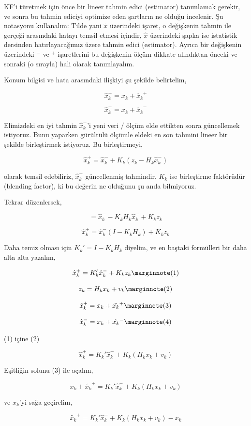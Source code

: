 \documentclass[12pt,fleqn]{article}\usepackage{../../common}
\begin{document}
KF'i türetmek için önce bir lineer tahmin edici (estimator) tanımlamak gerekir,
ve sonra bu tahmin ediciyi optimize eden şartların ne olduğu incelenir. Şu
notasyonu kullanalım: Tilde yani $\tilde{x}$ üzerindeki işaret, o değişkenin
tahmin ile gerçeği arasındaki hatayı temsil etmesi içindir, $\hat{x}$ üzerindeki
şapka ise istatistik dersinden hatırlayacağımız üzere tahmin edici
(estimator). Ayrıca bir değişkenin üzerindeki $^-$ ve $^+$ işaretlerini bu
değişkenin ölçüm dikkate alındıktan önceki ve sonraki (o sırayla) hali olarak
tanımlayalım.

Konum bilgisi ve hata arasındaki ilişkiyi şu şekilde belirtelim,

$$ \hat{x}_k^+ = x_k + \tilde{x_k}^+ $$

$$ \hat{x}_k^- = x_k + \tilde{x_k}^- $$

Elimizdeki en iyi tahmin $\hat{x}_k^-$'i yeni veri / ölçüm elde ettikten sonra
güncellemek istiyoruz. Bunu yaparken gürültülü ölçümle eldeki en son tahmini
lineer bir şekilde birleştirmek istiyoruz. Bu birleştirmeyi,

$$ \hat{x}_k^+ = \hat{x}_k^- + K_k (z_k - H_k \hat{x}_k^-)   $$

olarak temsil edebiliriz, $\hat{x}_k^+$ güncellenmiş tahmindir, $K_k$ ise
birleştirme faktörüdür (blending factor), ki bu değerin ne olduğunu şu anda
bilmiyoruz.

Tekrar düzenlersek, 

$$= \hat{x}_k^- - K_kH_k\hat{x}_k^- + K_kz_k    $$

$$ \hat{x}_k^+ = \hat{x}_k^- (I - K_kH_k) + K_kz_k $$

Daha temiz olması için $K_k' = I - K_kH_k$ diyelim, ve en baştaki
formülleri bir daha alta alta yazalım,

$$ 
\hat{x}_k^+  = K_k' \hat{x}_k^- + K_kz_k  
\mlabel{1}  
$$

$$ 
z_k = H_k x_k + v_k 
\mlabel{2} 
$$

$$ 
\hat{x}_k^+ = x_k + \tilde{x_k}^+ 
\mlabel{3} 
$$

$$ 
\hat{x}_k^- = x_k + \tilde{x_k}^- 
\mlabel{4}
$$

(1) içine (2)

$$ \hat{x}_k^+ = K_k' \hat{x}_k^- + K_k(H_k x_k + v_k)   $$

Eşitliğin solunu (3) ile açalım,

$$ x_k + \tilde{x_k}^+ = K_k' \hat{x}_k^- + K_k(H_k x_k + v_k)   $$

ve $x_k$'yi sağa geçirelim,

$$ \tilde{x_k}^+ = K_k' \hat{x}_k^- + K_k(H_k x_k + v_k) - x_k   $$
\end{document}

